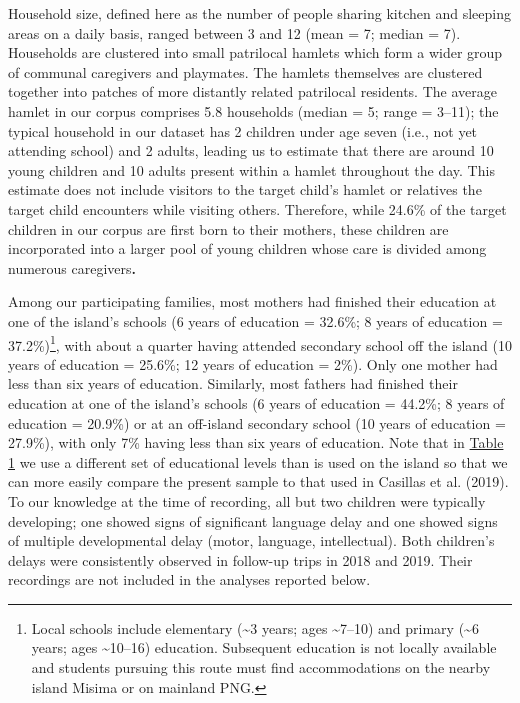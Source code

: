 \documentclass[,man,floatsintext]{apa6}
\begin{document}
Household size, defined here as the number of people sharing kitchen and
sleeping areas on a daily basis, ranged between 3 and 12 (mean = 7;
median = 7). Households are clustered into small patrilocal hamlets
which form a wider group of communal caregivers and playmates. The
hamlets themselves are clustered together into patches of more distantly
related patrilocal residents. The average hamlet in our corpus comprises
5.8 households (median = 5; range = 3--11); the typical household in our
dataset has 2 children under age seven (i.e., not yet attending school)
and 2 adults, leading us to estimate that there are around 10 young
children and 10 adults present within a hamlet throughout the day. This
estimate does not include visitors to the target child's hamlet or
relatives the target child encounters while visiting others. Therefore,
while 24.6\% of the target children in our corpus are first born to
their mothers, these children are incorporated into a larger pool of
young children whose care is divided among numerous caregivers\textbf{.}

Among our participating families, most mothers had finished their
education at one of the island's schools (6 years of education = 32.6\%;
8 years of education = 37.2\%)\footnote{Local schools include elementary
  (\textasciitilde{}3 years; ages \textasciitilde{}7--10) and primary
  (\textasciitilde{}6 years; ages \textasciitilde{}10--16) education.
  Subsequent education is not locally available and students pursuing
  this route must find accommodations on the nearby island Misima or on
  mainland PNG.}, with about a quarter having attended secondary school
off the island (10 years of education = 25.6\%; 12 years of education =
2\%). Only one mother had less than six years of education. Similarly,
most fathers had finished their education at one of the island's schools
(6 years of education = 44.2\%; 8 years of education = 20.9\%) or at an
off-island secondary school (10 years of education = 27.9\%), with only
7\% having less than six years of education. Note that in
\protect\hyperlink{tab1}{Table 1} we use a different set of educational
levels than is used on the island so that we can more easily compare the
present sample to that used in Casillas et al. (2019). To our knowledge
at the time of recording, all but two children were typically
developing; one showed signs of significant language delay and one
showed signs of multiple developmental delay (motor, language,
intellectual). Both children's delays were consistently observed in
follow-up trips in 2018 and 2019. Their recordings are not included in
the analyses reported below.
\end{document}
